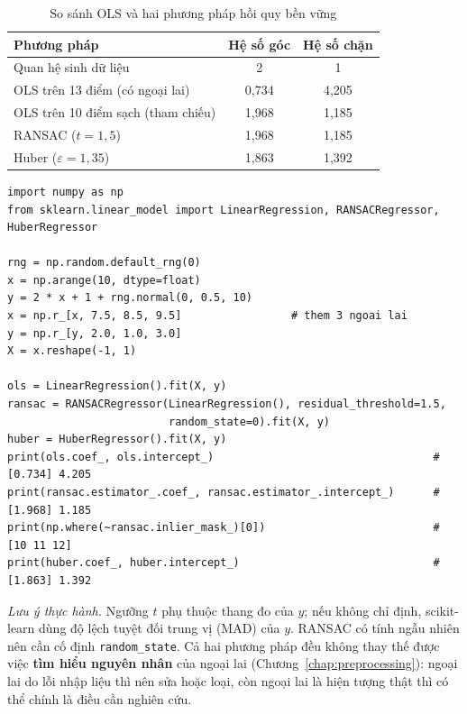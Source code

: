 \begin{table}[H]
\centering
\begin{tabular}{|l|c|c|}
\hline
\textbf{Phương pháp} & \textbf{Hệ số góc} & \textbf{Hệ số chặn} \\
\hline
Quan hệ sinh dữ liệu & 2 & 1 \\ \hline
OLS trên 13 điểm (có ngoại lai) & 0,734 & 4,205 \\ \hline
OLS trên 10 điểm sạch (tham chiếu) & 1,968 & 1,185 \\ \hline
RANSAC ($t = 1{,}5$) & 1,968 & 1,185 \\ \hline
Huber ($\varepsilon = 1{,}35$) & 1,863 & 1,392 \\ \hline
\end{tabular}
\caption{So sánh OLS và hai phương pháp hồi quy bền vững}
\label{tab:robust}
\end{table}


\begin{lstlisting}[caption={OLS, RANSAC và Huber trên dữ liệu có ngoại lai}]
import numpy as np
from sklearn.linear_model import LinearRegression, RANSACRegressor, HuberRegressor

rng = np.random.default_rng(0)
x = np.arange(10, dtype=float)
y = 2 * x + 1 + rng.normal(0, 0.5, 10)
x = np.r_[x, 7.5, 8.5, 9.5]                 # them 3 ngoai lai
y = np.r_[y, 2.0, 1.0, 3.0]
X = x.reshape(-1, 1)

ols = LinearRegression().fit(X, y)
ransac = RANSACRegressor(LinearRegression(), residual_threshold=1.5,
                         random_state=0).fit(X, y)
huber = HuberRegressor().fit(X, y)
print(ols.coef_, ols.intercept_)                                  # [0.734] 4.205
print(ransac.estimator_.coef_, ransac.estimator_.intercept_)      # [1.968] 1.185
print(np.where(~ransac.inlier_mask_)[0])                          # [10 11 12]
print(huber.coef_, huber.intercept_)                              # [1.863] 1.392
\end{lstlisting}

\noindent\textit{Lưu ý thực hành.} Ngưỡng $t$ phụ thuộc thang đo của $y$; nếu không chỉ định, scikit-learn dùng độ lệch tuyệt đối trung vị (MAD) của $y$. RANSAC có tính ngẫu nhiên nên cần cố định \texttt{random\_state}. Cả hai phương pháp đều không thay thế được việc \textbf{tìm hiểu nguyên nhân} của ngoại lai (Chương~\ref{chap:preprocessing}): ngoại lai do lỗi nhập liệu thì nên sửa hoặc loại, còn ngoại lai là hiện tượng thật thì có thể chính là điều cần nghiên cứu.

